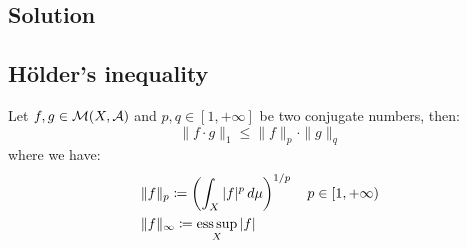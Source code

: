 \subsection*{Solution}

\subsection{Hölder's inequality}
Let $f,g \in \mathcal{M}(X,\mathcal{A})$ and $p,q \in [1,+\infty]$ be two conjugate numbers, then:
\[ \| f \cdot g \|_1 \leq \| f \|_p \cdot \| g \|_q \]
where we have:
\begin{align*}
    & \|f\|_p \coloneqq \left( \int_X |f|^p \, d\mu \right)^{1/p} \quad p \in [1,+\infty) \\
    & \|f\|_\infty \coloneqq \operatorname*{ess\,sup}_X |f|
\end{align*}

